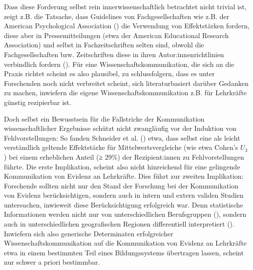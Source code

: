 \documentclass[
  jou,
  floatsintext,
  longtable,
  nolmodern,
  notxfonts,
  notimes,
  colorlinks=true,linkcolor=blue,citecolor=blue,urlcolor=blue]{apa7}
\begin{document}
Dass diese Forderung selbst rein innerwissenschaftlich betrachtet nicht
trivial ist, zeigt z.B. die Tatsache, dass Guidelines von
Fachgesellschaften wie z.B. der American Psychological Association
() die
Verwendung von Effektstärken fordern, diese aber in Pressemitteilungen
(etwa der American Educational Research Association) und selbst in
Fachzeitschriften selten sind, obwohl die Fachgesellschaften bzw.
Zeitschriften diese in ihren Autor:innenrichtlinien verbindlich fordern
(). Für eine
Wissenschaftskommunikation, die sich an die Praxis richtet scheint es
also plausibel, zu schlussfolgern, dass es unter Forschenden noch nicht
verbreitet scheint, sich literaturbasiert darüber Gedanken zu machen,
inwiefern die eigene Wissenschaftskommunikation z.B. für Lehrkräfte
günstig rezipierbar ist.

Doch selbst ein Bewusstsein für die Fallstricke der Kommunikation
wissenschaftlicher Ergebnisse schützt nicht zwangläufig vor der
Induktion von Fehlvorstellungen: So fanden Schneider et al.
() etwa, dass selbst eine als leicht
verständlich geltende Effektstärke für Mittelwertsvergleiche (wie etwa
Cohen's \(U_3\)) bei einem erheblichen Anteil (≥ 29\%) der
Rezipient:innen zu Fehlvorstellungen führte. Die erste Implikation,
scheint also nicht hinreichend für eine gelingende Kommunikation von
Evidenz an Lehrkräfte. Dies führt zur zweiten Implikation: Forschende
sollten nicht nur den Stand der Forschung bei der Kommunikation von
Evidenz berücksichtigen, sondern auch in intern und extern validen
Studien untersuchen, inwieweit diese Berücksichtigung erfolgreich war.
Denn statistische Informationen werden nicht nur von unterschiedlichen
Berufsgruppen (),
sondern auch in unterschiedlichen geografischen Regionen differentiell
interpretiert ().
Inwiefern sich also generische Determinaten erfolgreicher
Wissenschaftskommunikation auf die Kommunikation von Evidenz an
Lehrkräfte etwa in einem bestimmten Teil eines Bildungssystems
übertragen lassen, scheint nur schwer a priori bestimmbar.
\end{document}
